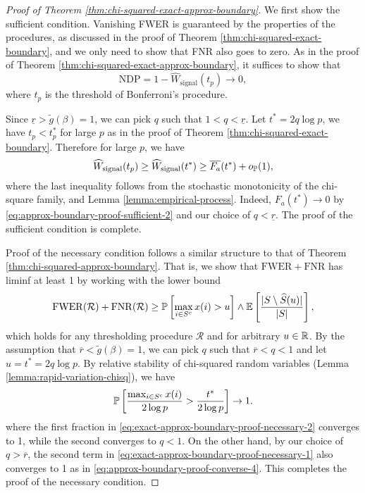 \begin{proof}[Proof of Theorem \ref{thm:chi-squared-exact-approx-boundary}]
We first show the sufficient condition.
Vanishing FWER is guaranteed by the properties of the procedures, as discussed in the proof  of Theorem \ref{thm:chi-squared-exact-boundary}, and we only need to show that FNR also goes to zero. 
As in the proof of Theorem \ref{thm:chi-squared-exact-approx-boundary}, it suffices to show that
\begin{equation} \label{eq:exact-approx-boundary-proof-sufficient-1}
    \text{NDP} = 1 - \widehat{W}_\text{signal}(t_p) \to 0,
\end{equation}
where $t_p$ is the threshold of Bonferroni's procedure.

Since $\underline{r}>\widetilde{g}(\beta)=1$, we can pick $q$ such that $1<q<\underline{r}$.
Let $t^* = 2q\log{p}$, we have $t_p<t_p^*$ for large $p$ as in the proof of Theorem \ref{thm:chi-squared-exact-boundary}.
Therefore for large $p$, we have
$$
\widehat{W}_\text{signal}(t_p) \ge \widehat{W}_\text{signal}(t^*) \ge \overline{F_a}(t^*) + o_\P(1),
$$
where the last inequality follows from the stochastic monotonicity of the chi-square family, and Lemma \ref{lemma:empirical-process}.
Indeed, $F_a(t^*)\to0$ by \eqref{eq:approx-boundary-proof-sufficient-2} and our choice of $q<\underline{r}$. 
The proof of the sufficient condition is complete.

Proof of the necessary condition follows a similar structure to that of Theorem \ref{thm:chi-squared-approx-boundary}.
That is, we show that $\mathrm{FWER} + \mathrm{FNR}$ has liminf at least 1 by working with the lower bound
\begin{equation} \label{eq:exact-approx-boundary-proof-necessary-1}
    \mathrm{FWER}(\mathcal{R}) + \mathrm{FNR}(\mathcal{R}) \ge \P\left[\max_{i\in S^c}x(i)>u\right] \wedge \E\left[\frac{|S\setminus \widehat{S}(u)|}{|S|}\right],
\end{equation}
which holds for any thresholding procedure $\mathcal{R}$ and for arbitrary $u\in\R$.
By the assumption that $\overline{r}<\widetilde{g}(\beta)=1$, we can pick $q$ such that $\overline{r}<q<1$ and let $u = t^*=2q\log{p}$.
By relative stability of chi-squared random variables (Lemma \ref{lemma:rapid-variation-chisq}), we have
\begin{equation} \label{eq:exact-approx-boundary-proof-necessary-2}
    \P\left[\frac{\max_{i\in S^c} x(i)}{2\log{p}} > \frac{t^*}{2\log{p}}\right] \to 1.
\end{equation}
where the first fraction in \eqref{eq:exact-approx-boundary-proof-necessary-2} converges to 1, while the second converges to $q<1$.
On the other hand, by our choice of $q>\overline{r}$, the second term in \eqref{eq:exact-approx-boundary-proof-necessary-1} also converges to 1 as in \eqref{eq:approx-boundary-proof-converse-4}.
This completes the proof of the necessary condition.
\end{proof}


